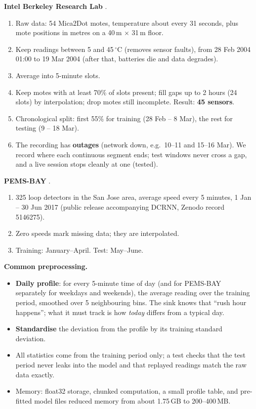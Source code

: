 \textbf{Intel Berkeley Research Lab} \cite{25}.
\begin{enumerate}
  \item Raw data: 54 Mica2Dot motes, temperature about every 31 seconds, plus mote positions in metres on a
        40\,m $\times$ 31\,m floor.
  \item Keep readings between 5 and 45\,$^\circ$C (removes sensor faults), from 28 Feb 2004 01:00 to 19 Mar 2004 (after
        that, batteries die and data degrades).
  \item Average into 5-minute slots.
  \item Keep motes with at least 70\% of slots present; fill gaps up to 2 hours (24 slots) by interpolation; drop
        motes still incomplete. Result: \textbf{45 sensors}.
  \item Chronological split: first 55\% for training (28 Feb -- 8 Mar), the rest for testing (9 -- 18 Mar).
  \item The recording has \textbf{outages} (network down, e.g.\ 10--11 and 15--16 Mar). We record where each continuous
        segment ends; test windows never cross a gap, and a live session stops cleanly at one (tested).
\end{enumerate}

\textbf{PEMS-BAY} \cite{24}.
\begin{enumerate}
  \item 325 loop detectors in the San Jose area, average speed every 5 minutes, 1 Jan -- 30 Jun 2017 (public release
        accompanying DCRNN, Zenodo record 5146275).
  \item Zero speeds mark missing data; they are interpolated.
  \item Training: January--April. Test: May--June.
\end{enumerate}

\textbf{Common preprocessing.}
\begin{itemize}
  \item \textbf{Daily profile}: for every 5-minute time of day (and for PEMS-BAY separately for weekdays and weekends),
        the average reading over the training period, smoothed over 5 neighbouring bins. The sink knows that ``rush
        hour happens''; what it must track is how \emph{today} differs from a typical day.
  \item \textbf{Standardise} the deviation from the profile by its training standard deviation.
  \item All statistics come from the training period only; a test checks that the test period never leaks into the
        model and that replayed readings match the raw data exactly.
  \item Memory: float32 storage, chunked computation, a small profile table, and pre-fitted model files reduced memory
        from about 1.75\,GB to 200--400\,MB.
\end{itemize}

